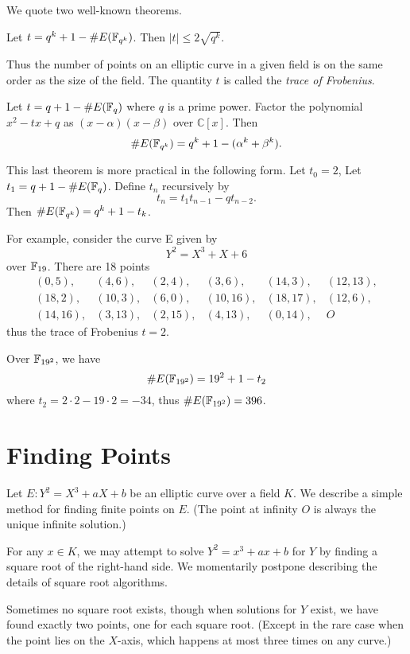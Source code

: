 We quote two well-known theorems.

\begin{theorem}
[Hasse] Let $t = q^k + 1 - \#E(\mathbb{F}_{q^k})$.
Then $|t| \le 2\sqrt{q^k}$.
\end{theorem}

Thus the number of points on an elliptic curve in a given field
is on the same order as the size of the field.
The quantity $t$ is called the \emph{trace of Frobenius}.

\begin{theorem}
[Weil] Let $t = q + 1 - \#E(\mathbb{F}_q)$
where $q$ is a prime power.
Factor the polynomial $x^2 - t x + q$ as $(x-\alpha)(x-\beta)$ over
$\mathbb{C}[x]$.
Then
\[ \#E(\mathbb{F}_{q^k}) = q^k + 1 - (\alpha^k + \beta^k) .\]
\end{theorem}

This last theorem is more practical in the following form. Let $t_0 = 2$,
Let $t_1 = q + 1 - \#E(\mathbb{F}_q)$.
Define $t_n$ recursively by
\[ t_n = t_1 t_{n-1} - q t_{n-2} .\]
Then $\#E(\mathbb{F}_{q^k}) = q^k + 1 - t_k$.

For example, consider the curve E\cite{bk} given by
\[ Y^2 = X^3 + X + 6 \]
over $\mathbb{F}_{19}$. There are 18 points
\[
\begin{array}{llllll}
(0,5), & (4,6), & (2,4), & (3,6), & (14,3), & (12,13), \\
(18,2), & (10,3), & (6,0), & (10,16), & (18, 17), & (12,6), \\
(14,16), & (3,13), & (2,15), & (4,13), & (0,14), & O
\end{array}
\]
thus the trace of Frobenius $t = 2$.

Over $\mathbb{F}_{{19}^2}$, we have
\[
\#E(\mathbb{F}_{{19}^2}) = 19^2 + 1 - t_2
\]
where $t_2 = 2\cdot 2 - 19 \cdot 2 = -34$, thus
$\#E(\mathbb{F}_{{19}^2}) = 396$.

\section {Finding Points}

Let $E : Y^2 = X^3 + a X + b$
be an elliptic curve over a field $K$.
We describe a simple method for finding finite points on $E$.
(The point at infinity $O$ is always the unique infinite solution.)

For any $x \in K$, we may attempt to
solve $Y^2 = x^3 + a x + b$ for $Y$ by finding a square root
of the right-hand side. We momentarily postpone describing the
details of square root algorithms.

Sometimes no square root exists, though when solutions for $Y$ exist,
we have found exactly two points, one for each square root. (Except
in the rare case when the point lies on the $X$-axis, which happens at
most three times on any curve.)

